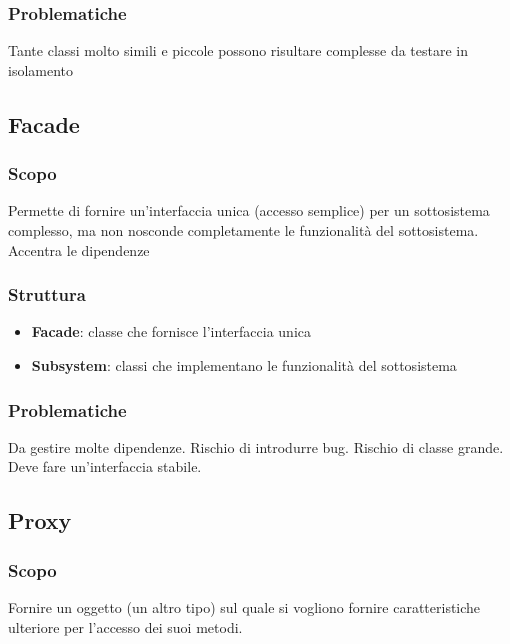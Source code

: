 \subsubsection{Problematiche}
Tante classi molto simili e piccole possono risultare complesse da testare in
isolamento

\subsection{Facade}
\subsubsection{Scopo}
Permette di fornire un'interfaccia unica (accesso semplice) per un sottosistema complesso, ma non
nosconde completamente le funzionalità del sottosistema. Accentra le dipendenze
\subsubsection{Struttura}
\begin{itemize}
    \item \textbf{Facade}: classe che fornisce l'interfaccia unica
    \item \textbf{Subsystem}: classi che implementano le funzionalità del sottosistema
\end{itemize}
\subsubsection{Problematiche}
Da gestire molte dipendenze. Rischio di introdurre bug. Rischio di classe grande. Deve fare un'interfaccia stabile. 

\subsection{Proxy}
\subsubsection{Scopo}
Fornire un oggetto (un altro tipo) sul quale si vogliono fornire caratteristiche ulteriore per l'accesso dei suoi metodi.

